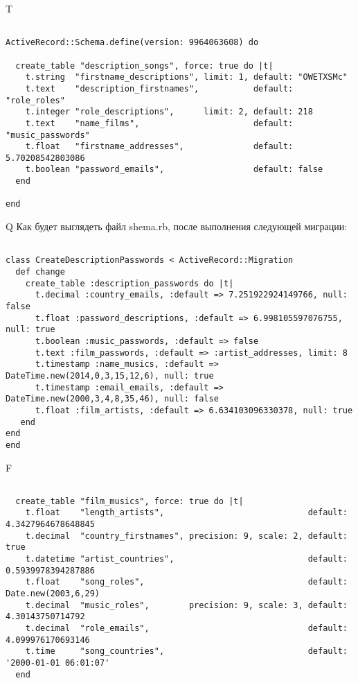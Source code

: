 T
\begin{verbatim}

ActiveRecord::Schema.define(version: 9964063608) do

  create_table "description_songs", force: true do |t|
    t.string  "firstname_descriptions", limit: 1, default: "OWETXSMc"
    t.text    "description_firstnames",           default: "role_roles"
    t.integer "role_descriptions",      limit: 2, default: 218
    t.text    "name_films",                       default: "music_passwords"
    t.float   "firstname_addresses",              default: 5.70208542803086
    t.boolean "password_emails",                  default: false
  end

end
\end{verbatim}

Q
Как будет выглядеть файл shema.rb, после выполнения следующей миграции:

\begin{verbatim}

class CreateDescriptionPasswords < ActiveRecord::Migration 
  def change 
    create_table :description_passwords do |t| 
      t.decimal :country_emails, :default => 7.251922924149766, null: false
      t.float :password_descriptions, :default => 6.998105597076755, null: true
      t.boolean :music_passwords, :default => false
      t.text :film_passwords, :default => :artist_addresses, limit: 8
      t.timestamp :name_musics, :default => DateTime.new(2014,0,3,15,12,6), null: true
      t.timestamp :email_emails, :default => DateTime.new(2000,3,4,8,35,46), null: false
      t.float :film_artists, :default => 6.634103096330378, null: true
   end
end
end
\end{verbatim}

F
\begin{verbatim}

  create_table "film_musics", force: true do |t|
    t.float    "length_artists",                             default: 4.3427964678648845
    t.decimal  "country_firstnames", precision: 9, scale: 2, default: true
    t.datetime "artist_countries",                           default: 0.5939978394287886
    t.float    "song_roles",                                 default: Date.new(2003,6,29)
    t.decimal  "music_roles",        precision: 9, scale: 3, default: 4.30143750714792
    t.decimal  "role_emails",                                default: 4.099976170693146
    t.time     "song_countries",                             default: '2000-01-01 06:01:07'
  end

\end{verbatim}


